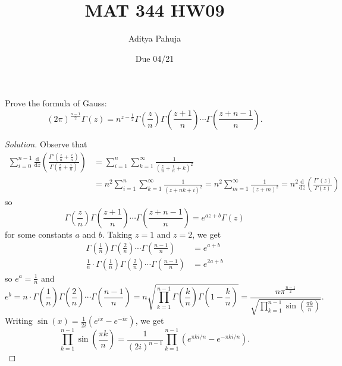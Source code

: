 \documentclass[10pt]{article}
\title{MAT 344 HW09}
\author{\large Aditya Pahuja}
\date{\large Due 04/21}
\newcommand{\dd}{\mathrm{d}}
\providecommand{\half}{\frac{1}{2}}
\newenvironment{soln}{\begin{proof}[Solution]}{\end{proof}}
\providecommand{\paren}[1]{\left(#1\right)}
\begin{document}
\maketitle

\begin{problem}
    [p.200\#1]
    Prove the formula of Gauss:
    \begin{equation*}
	(2\pi)^{\frac{n-1}2}\Gamma(z)
	= n^{z - \half} \Gamma\paren{\frac zn}\Gamma\paren{\frac{z+1}n}
	\cdots\Gamma\paren{\frac{z+n-1}n}.
    \end{equation*}
\end{problem}

\begin{soln}
    Observe that
    \begin{align*}
	\sum_{i=0}^{n-1} \frac{\dd}{\dd z}
	\paren{\frac{\Gamma'(\frac zn + \frac in)}
	{\Gamma(\frac zn + \frac in)}}
	&= \sum_{i=1}^n \sum_{k=1}^\infty
	\frac 1{(\frac zn + \frac in + k)^2}\\
	&= n^2\sum_{i=1}^n \sum_{k=1}^\infty \frac 1{(z + nk + i)^2}
	= n^2\sum_{m=1}^\infty \frac 1{(z + m)^2}
	= n^2\frac{\dd}{\dd z}\paren{\frac{\Gamma'(z)}{\Gamma(z)}}
    \end{align*}
    so
    \begin{equation*}
        \Gamma\paren{\frac zn}\Gamma\paren{\frac{z+1}n}
	\cdots\Gamma\paren{\frac{z+n-1}n} = e^{az + b}\Gamma(z)
    \end{equation*}
    for some constants $a$ and $b$. Taking $z = 1$ and $z = 2$, we get
    \begin{align*}
        \Gamma\paren{\frac 1n}\Gamma\paren{\frac{2}n}
	\cdots\Gamma\paren{\frac{n-1}n}
	&= e^{a + b}\\
        \frac 1n\cdot \Gamma\paren{\frac 1n}\Gamma\paren{\frac{2}n}
	\cdots\Gamma\paren{\frac{n-1}n}
	&= e^{2a + b}
    \end{align*}
    so $e^a = \frac 1n$ and
    \begin{equation*}
	e^b = n
        \cdot \Gamma\paren{\frac 1n}\Gamma\paren{\frac{2}n}
	\cdots\Gamma\paren{\frac{n-1}n}
	= n\sqrt{\prod_{k=1}^{n-1}
	\Gamma\paren{\frac kn}\Gamma\paren{1- \frac kn}}
	= \frac{n\pi^{\frac{n-1}2}}{\sqrt{\prod_{k=1}^{n-1}
	\sin(\frac{\pi k}n)}}.
    \end{equation*}
    Writing $\sin(x) = \frac 1{2i}(e^{ix} - e^{-ix})$, we get
    \begin{equation*}
	\prod_{k=1}^{n-1} \sin\paren{\frac{\pi k}n} = \frac 1{(2i)^{n-1}}
	\prod_{k=1}^{n-1} (e^{\pi k i/n} - e^{-\pi k i/n}).
    \end{equation*}

\end{soln}
\end{document}
